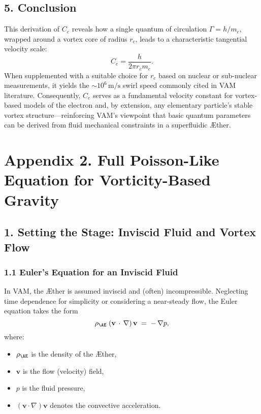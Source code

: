 \documentclass[aps,preprint,superscriptaddress]{revtex4-2}
\begin{document}
    \subsection*{5. Conclusion}

    This derivation of \(C_e\) reveals how a single quantum of circulation \(\Gamma = h/m_e\), wrapped around a vortex core of radius \(r_c\), leads to a characteristic tangential velocity scale:
    \[
        C_e = \frac{h}{2\pi r_c m_e}.
    \]
    When supplemented with a suitable choice for \(r_c\) based on nuclear or sub-nuclear measurements, it yields the \(\sim10^6\,\text{m/s}\) swirl speed commonly cited in VAM literature. Consequently, \(C_e\) serves as a fundamental velocity constant for vortex-based models of the electron and, by extension, any elementary particle’s stable vortex structure—reinforcing VAM’s viewpoint that basic quantum parameters can be derived from fluid mechanical constraints in a superfluidic Æther.

    \section*{Appendix 2. Full Poisson-Like Equation for Vorticity-Based Gravity}

    \subsection*{1. Setting the Stage: Inviscid Fluid and Vortex Flow}

    \subsubsection*{1.1 Euler’s Equation for an Inviscid Fluid}
    In VAM, the Æther is assumed inviscid and (often) incompressible. Neglecting time dependence for simplicity or considering a near-steady flow, the Euler equation takes the form
    \[
        \rho_{\mathrm{\AE}}\;(\mathbf{v}\,\cdot\,\nabla)\,\mathbf{v}
        \;=\;
        -\,\nabla p,
    \]
    where:
    \begin{itemize}
        \item \(\rho_{\mathrm{\AE}}\) is the density of the Æther,
        \item \(\mathbf{v}\) is the flow (velocity) field,
        \item \(p\) is the fluid pressure,
        \item \((\mathbf{v}\cdot\nabla)\mathbf{v}\) denotes the convective acceleration.
    \end{itemize}
\end{document}

